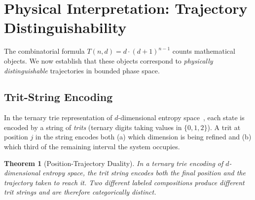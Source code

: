 \documentclass[twocolumn,10pt,a4paper]{article}
\newtheorem{theorem}{Theorem}[section]
\theoremstyle{definition}
\theoremstyle{remark}
\begin{document}
\section{Physical Interpretation: Trajectory Distinguishability}
\label{sec:distinguishability}

The combinatorial formula $T(n,d) = d \cdot (d+1)^{n-1}$ counts mathematical objects. We now establish that these objects correspond to \emph{physically distinguishable} trajectories in bounded phase space.

\subsection{Trit-String Encoding}

In the ternary trie representation of $d$-dimensional entropy space~\cite{sachikonye2025ternary}, each state is encoded by a string of \emph{trits} (ternary digits taking values in $\{0, 1, 2\}$). A trit at position $j$ in the string encodes both (a) which dimension is being refined and (b) which third of the remaining interval the system occupies.

\begin{theorem}[Position-Trajectory Duality]
\label{thm:duality}
In a ternary trie encoding of $d$-dimensional entropy space, the trit string encodes both the final position and the trajectory taken to reach it. Two different labeled compositions produce different trit strings and are therefore categorically distinct.
\end{theorem}
\end{document}
